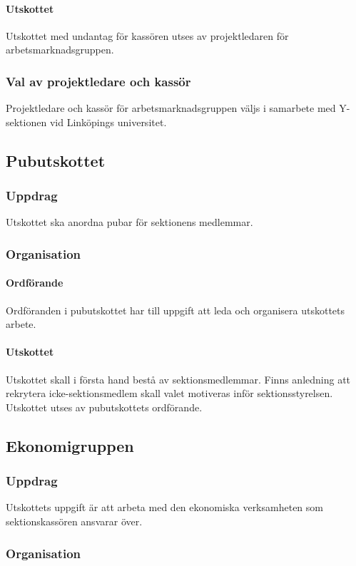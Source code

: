 \documentclass{datateknologsektionen-document}
\begin{document}
\paragraph{Utskottet}
Utskottet med undantag för kassören utses av projektledaren för arbetsmarknadsgruppen.
\subsubsection{Val av projektledare och kassör}
Projektledare och kassör för arbetsmarknadsgruppen väljs i samarbete med Y-sektionen vid
Linköpings universitet.

\subsection{Pubutskottet}
\label{pubu}
\subsubsection{Uppdrag}
Utskottet ska anordna pubar för sektionens medlemmar.
\subsubsection{Organisation}
\paragraph{Ordförande}
Ordföranden i pubutskottet har till uppgift att leda och organisera utskottets arbete.
\paragraph{Utskottet}
Utskottet skall i första hand bestå av sektionsmedlemmar. Finns anledning att rekrytera icke-sektionsmedlem skall valet motiveras inför sektionsstyrelsen. Utskottet utses av pubutskottets ordförande.

\subsection{Ekonomigruppen}
\label{ekonomigruppen}
\subsubsection{Uppdrag}
Utskottets uppgift är att arbeta med den ekonomiska verksamheten som sektionskassören ansvarar över.
\subsubsection{Organisation}
\end{document}

